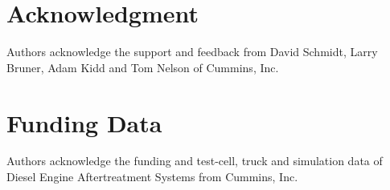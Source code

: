 \documentclass[subscriptcorrection,upint,varvw,barcolor=Goldenrod3,mathalfa=cal=euler,balance,hyphenate,french,pdf-a]{asmejour}
\begin{document}
\section*{Acknowledgment}
Authors acknowledge the support and feedback from David Schmidt, Larry Bruner, Adam Kidd and Tom Nelson of Cummins, Inc.
\section*{Funding Data}
Authors acknowledge the funding and test-cell, truck and simulation data of Diesel Engine Aftertreatment Systems from Cummins, Inc.

\appendix   %



\end{document}
